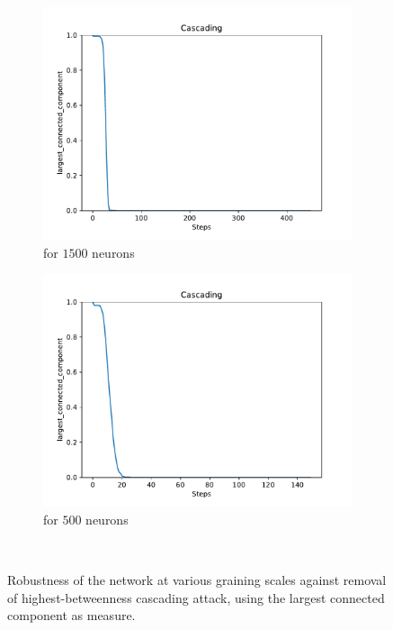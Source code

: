 \begin{figure}
\begin{subfigure}[b]{0.45\textwidth}
		\centering
		\includegraphics[width=\textwidth]{Images/plots_cascading/cascading_38.pdf}
		\caption{for $1500$ neurons}
	\end{subfigure}
	\hfill
	\begin{subfigure}[b]{0.45\textwidth}
		\centering
		\includegraphics[width=\textwidth]{Images/plots_cascading/cascading_40.pdf}
		\caption{for $500$ neurons}
	\end{subfigure}
	\\ \vspace{5mm}
	
	
	\caption{Robustness of the network at various graining scales against removal of highest-betweenness cascading attack, using the largest connected component as measure.}
	\label{fig:cascading_atk}
\end{figure}